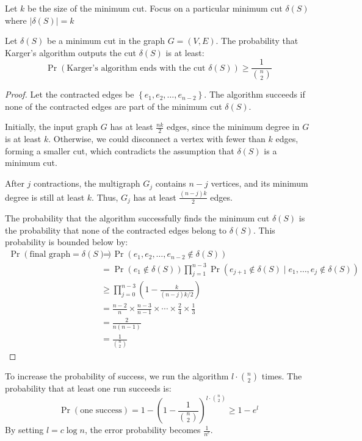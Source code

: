 Let $k$ be the size of the minimum cut. 
Focus on a particular minimum cut $\delta(S)$ where $|\delta(S)|=k$
\begin{lemma}
    Let $\delta(S)$ be a minimum cut in the graph $G=(V,E)$. 
    The probability that Karger's algorithm outputs the cut $\delta(S)$ is at least:
    \[\Pr(\text{Karger's algorithm ends with the cut }\delta(S))\geq\dfrac{1}{\binom{n}{2}}\]
\end{lemma}
\begin{proof}
    Let the contracted edges be $\left\{e_1,e_2,\dots,e_{n-2}\right\}$. 
    The algorithm succeeds if none of the contracted edges are part of the minimum cut $\delta(S)$.

    Initially, the input graph $G$ has at least $\frac{nk}{2}$ edges, since the minimum degree in $G$ is at least $k$. 
    Otherwise, we could disconnect a vertex with fewer than $k$ edges, forming a smaller cut, which contradicts the assumption that $\delta(S)$ is a minimum cut.

    After $j$ contractions, the multigraph $G_j$ contains $n - j$ vertices, and its minimum degree is still at least $k$. 
    Thus, $G_j$ has at least $\frac{(n - j)k}{2}$ edges.

    The probability that the algorithm successfully finds the minimum cut $\delta(S)$ is the probability that none of the contracted edges belong to $\delta(S)$. 
    This probability is bounded below by:
    \begin{align*}
        \Pr(\text{final graph} = \delta(S)) &= \Pr(e_1, e_2, \dots, e_{n-2} \notin \delta(S)) \\
                                            &= \Pr(e_1 \notin \delta(S)) \prod_{j=1}^{n-3} \Pr(e_{j+1} \notin \delta(S) \mid e_1, \dots, e_j \notin \delta(S)) \\
                                            &\geq \prod_{j=0}^{n-3} \left( 1 - \frac{k}{(n-j)k/2} \right) \\
                                            &= \frac{n-2}{n} \times \frac{n-3}{n-1} \times \cdots \times \frac{2}{4} \times \frac{1}{3} \\
                                            &= \frac{2}{n(n-1)} \\
                                            &= \frac{1}{\binom{n}{2}}
    \end{align*}
\end{proof}
To increase the probability of success, we run the algorithm $l\cdot \binom{n}{2}$ times. 
The probability that at least one run succeeds is:
\[\Pr(\text{one success})=1-\left(1-\dfrac{1}{\binom{n}{2}}\right)^{l\cdot\binom{n}{2}}\geq 1-e^l\]
By setting $l = c \log n$, the error probability becomes $\frac{1}{n^c}$. 

